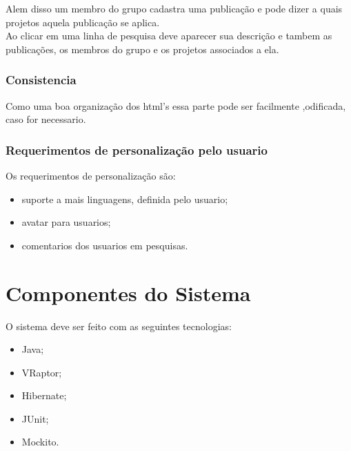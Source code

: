 \documentclass[11pt, a4paper]{article}
\begin{document}
				\indent Alem disso um membro do grupo cadastra uma publicação e
				pode dizer a quais projetos aquela publicação se aplica.\\
				\indent Ao clicar em uma linha de pesquisa deve aparecer sua 
				descrição e tambem as publicações, os membros do grupo e os 
				projetos associados a ela.
							
			\subsubsection{Consistencia}
				Como uma boa organização dos html's essa parte pode ser 
				facilmente ,odificada, caso for necessario.

			\subsubsection{Requerimentos de personalização pelo usuario}
				\noindent Os requerimentos de personalização são:
				\begin{itemize}
					\item suporte a mais linguagens, definida pelo usuario;
					\item avatar para usuarios;
					\item comentarios dos usuarios em pesquisas.
				\end{itemize}
				
    \section{Componentes do Sistema}
		\noindent O sistema deve ser feito com as seguintes tecnologias:
		\begin{itemize}
			\item Java;
			\item VRaptor;
			\item Hibernate;
			\item JUnit;
			\item Mockito.
		\end{itemize}
    
\end{document}
